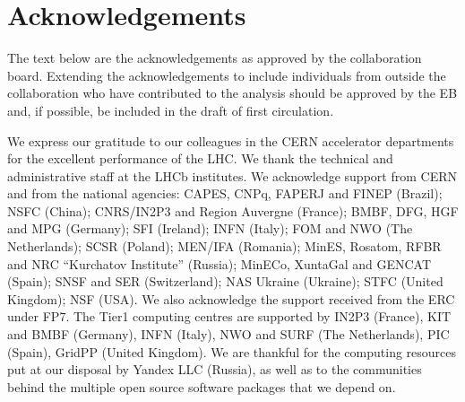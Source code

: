\section*{Acknowledgements}

The text below are the acknowledgements as approved by the collaboration
board. Extending the acknowledgements to include individuals from outside the
collaboration who have contributed to the analysis should be approved by the
EB and, if possible, be included in the draft of first circulation.
 
\noindent We express our gratitude to our colleagues in the CERN
accelerator departments for the excellent performance of the LHC. We
thank the technical and administrative staff at the LHCb
institutes. We acknowledge support from CERN and from the national
agencies: CAPES, CNPq, FAPERJ and FINEP (Brazil); NSFC (China);
CNRS/IN2P3 and Region Auvergne (France); BMBF, DFG, HGF and MPG
(Germany); SFI (Ireland); INFN (Italy); FOM and NWO (The Netherlands);
SCSR (Poland); MEN/IFA (Romania); MinES, Rosatom, RFBR and NRC
``Kurchatov Institute'' (Russia); MinECo, XuntaGal and GENCAT (Spain);
SNSF and SER (Switzerland); NAS Ukraine (Ukraine); STFC (United
Kingdom); NSF (USA). We also acknowledge the support received from the
ERC under FP7. The Tier1 computing centres are supported by IN2P3
(France), KIT and BMBF (Germany), INFN (Italy), NWO and SURF (The
Netherlands), PIC (Spain), GridPP (United Kingdom). We are thankful
for the computing resources put at our disposal by Yandex LLC
(Russia), as well as to the communities behind the multiple open
source software packages that we depend on.
